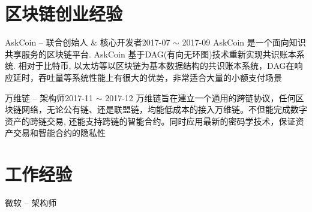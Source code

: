 \documentclass[10pt,a4paper]{moderncv}
\begin{document}
\vspace*{0.4\baselineskip}
\section{区块链创业经验}
\vspace*{0.2\baselineskip}
	{ AskCoin -- 联合创始人 \& 核心开发者}{2017-07 $\sim$ 2017-09}{}{}
	{AskCoin 是一个面向知识共享服务的区块链平台. AskCoin 基于DAG(有向无环图)技术重新实现共识账本系统. 相对于比特币, 以太坊等以区块链为基本数据结构的共识账本系统，DAG在响应延时，吞吐量等系统性能上有很大的优势，非常适合大量的小额支付场景}
\vspace{1ex}

	{万维链 -- 架构师}{2017-11 $\sim$ 2017-12}{}{}
	{万维链旨在建立一个通用的跨链协议，任何区块链网络，无论公有链、还是联盟链，均能低成本的接入万维链。不但能完成数字资产的跨链交易, 还能支持跨链的智能合约。同时应用最新的密码学技术，保证资产交易和智能合约的隐私性}
\vspace{1ex}

\vspace*{0.4\baselineskip}

\section{工作经验}
\vspace{2ex}

	{微软 -- 架构师}{}{}{}{}
\end{document}
